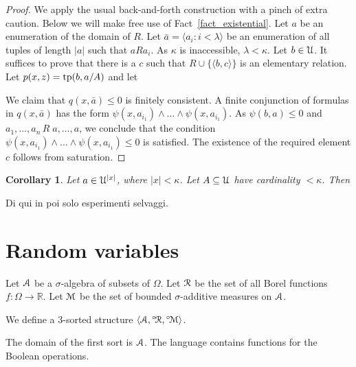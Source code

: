 \documentclass[12pt,letterpaper,oneside,reqno]{amsart}
\theoremstyle{plain}
\newtheorem{corollary}[theorem]{Corollary}
\theoremstyle{remark}
\begin{document}
\begin{proof}
  We apply the usual back-and-forth construction with a pinch of extra caution.
  Below we will make free use of Fact~\ref{fact_existential}.
  Let $a$ be an enumeration of the domain of $R$.
  Let $\bar a=\langle a_i:i<\lambda\rangle$ be an enumeration of all tuples of length $|a|$ such that $aRa_i$.
  As $\kappa$ is inaccessible, $\lambda<\kappa$.
  Let $b\in{\EuScript U}$.
  It suffices to prove that there is a $c$ such that $R\cup\{\langle b,c\rangle\}$ is an elementary relation.
  Let $p(x,z)={\rm tp}(b,a/A)$ and let
  

  We claim that $q(x,\bar a)\le0$ is finitely consistent.
  A finite conjunction of formulas in $q(x,\bar a)$ has the form $\psi(x,a_{i_1})\wedge\dots\wedge\psi(x,a_{i_1})$.
  As $\psi(b,a)\le0$ and $a_1,\dots,a_n\,R\;a,\dots,a$, we conclude that the condition $\psi(x,a_{i_1})\wedge\dots\wedge\psi(x,a_{i_1})\le0$ is satisfied.
  The existence of the required element $c$ follows from saturation.
\end{proof}

\begin{corollary}
  Let $a\in{\EuScript U}^{|x|}$, where $|x|<\kappa$.
  Let $A\subseteq{\EuScript U}$ have cardinality $<\kappa$.
  Then

\end{corollary}


\hrulefill

Di qui in poi solo esperimenti selvaggi.


\section{Random variables}

Let ${\EuScript A}$ be a $\sigma$-algebra of subsets of $\Omega$.
Let ${\EuScript R}$ be the set of all Borel functions $f:\Omega\to{\mathds R}$.
Let ${\EuScript M}$ be the set of bounded $\sigma$-additive measures on ${\EuScript A}$.

We define a $3$-sorted structure $\langle{\EuScript A},{}^{\circ\!}{\EuScript R},{}^{\circ\!}{\EuScript M}\rangle$.

The domain of the first sort is ${\EuScript A}$.
The language contains functions for the Boolean operations.
\end{document}

